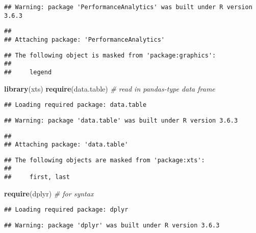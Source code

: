\documentclass[
]{article}
\newenvironment{Shaded}{\begin{snugshade}}{\end{snugshade}}
\newcommand{\CommentTok}[1]{\textcolor[rgb]{0.56,0.35,0.01}{\textit{#1}}}
\newcommand{\KeywordTok}[1]{\textcolor[rgb]{0.13,0.29,0.53}{\textbf{#1}}}
\newcommand{\NormalTok}[1]{#1}
\begin{document}
\begin{verbatim}
## Warning: package 'PerformanceAnalytics' was built under R version 3.6.3
\end{verbatim}

\begin{verbatim}
## 
## Attaching package: 'PerformanceAnalytics'
\end{verbatim}

\begin{verbatim}
## The following object is masked from 'package:graphics':
## 
##     legend
\end{verbatim}

\begin{Shaded}
\begin{Highlighting}[]
\KeywordTok{library}\NormalTok{(xts)}
\KeywordTok{require}\NormalTok{(data.table)  }\CommentTok{# read in pandas-type data frame}
\end{Highlighting}
\end{Shaded}

\begin{verbatim}
## Loading required package: data.table
\end{verbatim}

\begin{verbatim}
## Warning: package 'data.table' was built under R version 3.6.3
\end{verbatim}

\begin{verbatim}
## 
## Attaching package: 'data.table'
\end{verbatim}

\begin{verbatim}
## The following objects are masked from 'package:xts':
## 
##     first, last
\end{verbatim}

\begin{Shaded}
\begin{Highlighting}[]
\KeywordTok{require}\NormalTok{(dplyr)  }\CommentTok{# for syntax}
\end{Highlighting}
\end{Shaded}

\begin{verbatim}
## Loading required package: dplyr
\end{verbatim}

\begin{verbatim}
## Warning: package 'dplyr' was built under R version 3.6.3
\end{verbatim}
\end{document}
